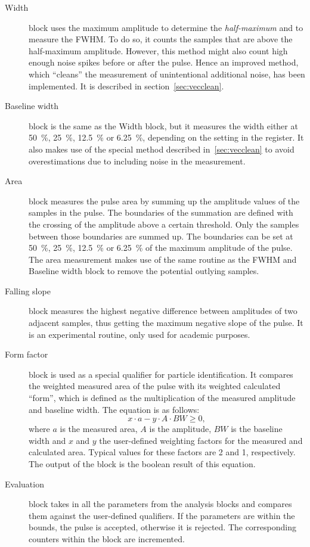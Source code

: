 \begin{description}
\item[Width] block uses the maximum amplitude to determine the \emph{half-maximum} and to measure the FWHM. To do so, it counts the samples that are above the half-maximum amplitude. However, this method might also count high enough noise spikes before or after the pulse. Hence an improved method, which ``cleans'' the measurement of unintentional additional noise, has been implemented. It is described in section~\ref{sec:vecclean}.
\item[Baseline width] block is the same as the Width block, but it measures the width either at 50~\%, 25~\%, 12.5~\% or 6.25~\%, depending on the setting in the register. It also makes use of the special method described in~\ref{sec:vecclean} to avoid overestimations due to including noise in the measurement.
\item[Area] block measures the pulse area by summing up the amplitude values of the samples in the pulse. The boundaries of the summation are defined with the crossing of the amplitude above a certain threshold. Only the samples between those boundaries are summed up. The boundaries can be set at  50~\%, 25~\%, 12.5~\% or 6.25~\% of the maximum amplitude of the pulse. The area measurement makes use of the same routine as the FWHM and Baseline width block to remove the potential outlying samples.

\item[Falling slope] block measures the highest negative difference between amplitudes of two adjacent samples, thus getting the maximum negative slope of the pulse. It is an experimental routine, only used for academic purposes.
\item[Form factor] block is used as a special qualifier for particle identification. It compares the weighted measured area of the pulse with its weighted calculated ``form'', which is defined as the multiplication of the measured amplitude and baseline width. The equation is as follows:
\begin{equation}
\label{eq:formfactor1}
x\cdot a - y \cdot A \cdot BW \geq 0,
\end{equation}
where $a$ is the measured area, $A$ is the amplitude, $BW$ is the baseline width and $x$ and $y$ the user-defined weighting factors for the measured and calculated area. Typical values for these factors are 2 and 1, respectively. The output of the block is the boolean result of this equation.
\item[Evaluation] block takes in all the parameters from the analysis blocks and compares them against the user-defined qualifiers. If the parameters are within the bounds, the pulse is accepted, otherwise it is rejected. The corresponding counters within the block are incremented.

\end{description}


